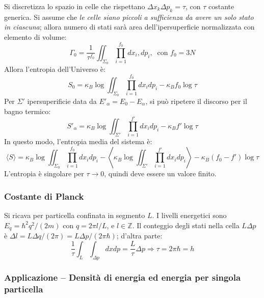 \documentclass[10pt, a4paper]{scrartcl}
\numberwithin{equation}{subsection}
\theoremstyle{style1}
\begin{document}
Si discretizza lo spazio in celle che rispettano $\Delta x_k \Delta p_k = \tau $, con $\tau $ costante generica. Si assume che \textit{le celle siano piccoli a sufficienza da avere un solo stato in ciascuna}; allora numero di stati sar\`a area dell'ipersuperficie normalizzata con elemento di volume:
\begin{equation}
	\Gamma_0 = \frac{1}{\tau ^{f_0} } \iint_{\Sigma_0} \prod_{i=1} ^{f_0}  dx_i , dp_i , \ \text{ con } f_0 = 3N
\end{equation}
Allora l'entropia dell'Universo \`e:
\begin{equation}
	S_0 = \kappa _B \log \iint_{\Sigma_0} \prod_{i=1} ^{f_0} dx_i dp_i - \kappa _B f_0 \log \tau 
\end{equation}
Per $\Sigma'$ ipersuperificie data da $E'_\alpha  = E_0 - E_\alpha $, si pu\`o ripetere il discorso per il bagno termico:
\begin{equation}
	S'_\alpha  = \kappa _B \log \iint_{\Sigma'} \prod_{i=1} ^{f'} dx_i dp_i - \kappa _B f' \log \tau 
\end{equation}
In questo modo, l'entropia media del sistema \`e:
\begin{equation}
	\langle S \rangle = \kappa _B \log \iint_{\Sigma_0} \prod_{i=1} ^{f_0} dx_i dp_i - \left\langle \kappa _B \log \iint_{\Sigma'} \prod_{i=1} ^{f'} dx_i dp_i \right\rangle - \kappa _B (f_0-f') \log \tau 
\end{equation}
L'entropia \`e singolare per $\tau \to 0$, quindi deve essere un valore finito.

\subsubsection{Costante di Planck}
Si ricava per particella confinata in segmento $L$. I livelli energetici sono $E_q = \hbar ^2 q^2 / (2m)$ con $q = 2\pi l / L$, e $l \in \mathbb{Z}$. Il conteggio degli stati nella cella $L \Delta p$ \`e $\Delta l = L\Delta q / (2\pi) = L\Delta p /(2\pi\hbar )$; d'altra parte:
\[
\frac{1}{\tau }\int_{L} \int_{\Delta p} dxdp = \frac{L}{\tau }\Delta p \Rightarrow \tau  =2\pi \hbar  = h
\] 
\subsubsection{Applicazione -- Densit\`a di energia ed energia per singola particella}\label{1p}
\end{document}
